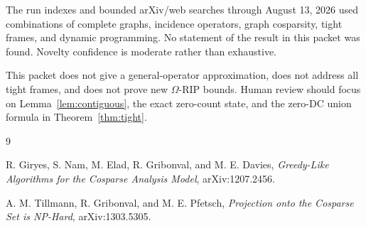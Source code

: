 \documentclass[11pt]{article}
\begin{document}
The run indexes and bounded arXiv/web searches through August 13, 2026 used
combinations of complete graphs, incidence operators, graph cosparsity, tight
frames, and dynamic programming. No statement of the result in this packet was
found. Novelty confidence is moderate rather than exhaustive.

This packet does not give a general-operator approximation, does not address
all tight frames, and does not prove new $\Omega$-RIP bounds. Human review
should focus on Lemma~\ref{lem:contiguous}, the exact zero-count state, and
the zero-DC union formula in Theorem~\ref{thm:tight}.

\begin{thebibliography}{9}

R. Giryes, S. Nam, M. Elad, R. Gribonval, and M. E. Davies,
\emph{Greedy-Like Algorithms for the Cosparse Analysis Model},
arXiv:1207.2456.

A. M. Tillmann, R. Gribonval, and M. E. Pfetsch,
\emph{Projection onto the Cosparse Set is NP-Hard},
arXiv:1303.5305.

\end{thebibliography}
\end{document}
